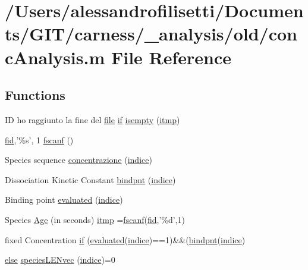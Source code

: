 \hypertarget{a00025}{\section{/\+Users/alessandrofilisetti/\+Documents/\+G\+I\+T/carness/\+\_\+analysis/old/conc\+Analysis.m File Reference}
\label{a00025}
}
\subsection*{Functions}
\begin{DoxyCompactItemize}
\item 
I\+D ho raggiunto la fine del \hyperlink{a00110_a4e8353d6c62cf54bf4a1a8f63e56b8c3}{file} \hyperlink{a00030_a01d55766b8058903dd360b4bda71f9f5}{if} \hyperlink{a00025_ac10445404f4b83302522defb59e25ef7}{isempty} (\hyperlink{a00025_af17812863fb385a507b5b07ed6166569}{itmp})
\item 
\hyperlink{a00031_ae9011d40c6f13e68e6f07156e0da7c5d}{fid},'\%s', 1 \hyperlink{a00025_a028ac102a731e62fb0a7439381f566c1}{fscanf} ()
\item 
Species sequence \hyperlink{a00025_a816e2260bf1c36cbca7ade7517c19b07}{concentrazione} (\hyperlink{a00025_a776b2bbd08be028d44f6d4260f27633a}{indice})
\item 
Dissociation Kinetic Constant \hyperlink{a00025_abe7c50c8b184b4269ba5aaecedcd5457}{bindpnt} (\hyperlink{a00025_a776b2bbd08be028d44f6d4260f27633a}{indice})
\item 
Binding point \hyperlink{a00025_a5e1fe2a8074aede6ad4a7a0613f0f91c}{evaluated} (\hyperlink{a00025_a776b2bbd08be028d44f6d4260f27633a}{indice})
\item 
Species \hyperlink{a00025_aefba28007767b12696670c7309808dd1}{Age} (in seconds) \hyperlink{a00025_af17812863fb385a507b5b07ed6166569}{itmp} =\hyperlink{a00025_a028ac102a731e62fb0a7439381f566c1}{fscanf}(\hyperlink{a00031_ae9011d40c6f13e68e6f07156e0da7c5d}{fid},'\%d',1)
\item 
fixed Concentration \hyperlink{a00025_adf3394dfd4755fd0ef2854fe558ff8aa}{if} (\hyperlink{a00025_a5e1fe2a8074aede6ad4a7a0613f0f91c}{evaluated}(\hyperlink{a00025_a776b2bbd08be028d44f6d4260f27633a}{indice})==1)\&\&(\hyperlink{a00025_abe7c50c8b184b4269ba5aaecedcd5457}{bindpnt}(\hyperlink{a00025_a776b2bbd08be028d44f6d4260f27633a}{indice})
\item 
\hyperlink{a00031_af5946383720aa572eb93e1e63afc23c2}{else} \hyperlink{a00025_a63d65c48296edd79c9a2419e091206d0}{species\+L\+E\+Nvec} (\hyperlink{a00025_a776b2bbd08be028d44f6d4260f27633a}{indice})=0

\end{DoxyCompactItemize}
